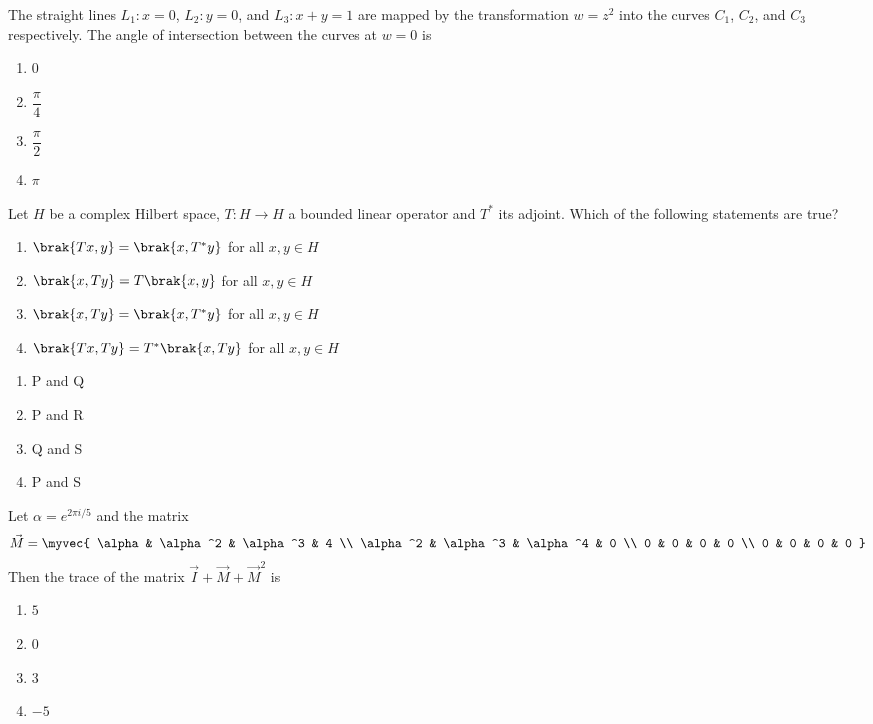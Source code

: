 \item
The straight lines $L_1: x = 0$, $L_2: y = 0$, and $L_3: x + y = 1$ are mapped by the transformation $w = z^2$ into the curves $C_1$, $C_2$, and $C_3$ respectively. The angle of intersection between the curves at $w = 0$ is
\hfill{}
\begin{multicols}{4}
\begin{enumerate}
  \item $0$
  \item $\dfrac{\pi}{4}$
  \item $\dfrac{\pi}{2}$
  \item $\pi$
\end{enumerate}
\end{multicols}

\item
Let $H$ be a complex Hilbert space, $T: H \to H$ a bounded linear operator and $T^*$ its adjoint. Which of the following statements are true?
\hfill{}
\begin{enumerate}[label=\Alph*., start=16]
\item $\brak{ Tx, y } = \brak{ x, T^*y }$ for all $x, y \in H$
\item $\brak{ x, Ty } = T \brak{ x, y }$ for all $x, y \in H$
\item $\brak{ x, Ty } = \brak{ x, T^*y }$ for all $x, y \in H$
\item $\brak{ Tx, Ty } = T^* \brak{ x, Ty }$ for all $x, y \in H$
\end{enumerate}
\begin{multicols}{4}
\begin{enumerate}
  \item P and Q
  \item P and R
  \item Q and S
  \item P and S
\end{enumerate}
\end{multicols}
\item
Let $\alpha = e^{2 \pi i/5}$ and the matrix
\begin{align*}
\vec{M} = \myvec{
\alpha & \alpha^2 & \alpha^3 & 4 \\
\alpha^2 & \alpha^3 & \alpha^4 & 0 \\
0 & 0 & 0 & 0 \\
0 & 0 & 0 & 0
}
\end{align*}
Then the trace of the matrix $\vec{I} + \vec{M} + \vec{M}^2$ is
\hfill{}
\begin{multicols}{4}
\begin{enumerate}
  \item $5$
  \item $0$
  \item $3$
  \item $-5$
\end{enumerate}
\end{multicols}
